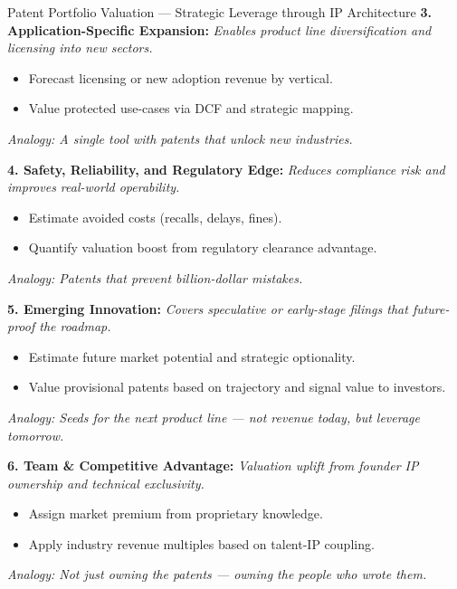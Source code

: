\begin{TechnicalSidebar}{Patent Portfolio Valuation --- Strategic Leverage through IP Architecture}
    \textbf{3. Application-Specific Expansion:}  
    \textit{Enables product line diversification and licensing into new sectors.}

    \medskip
    \begin{itemize}
      \item Forecast licensing or new adoption revenue by vertical.
      \item Value protected use-cases via DCF and strategic mapping.
    \end{itemize}

    \medskip

    \textit{Analogy: A single tool with patents that unlock new industries.}
    
    \medskip
    
    \textbf{4. Safety, Reliability, and Regulatory Edge:}  
    \textit{Reduces compliance risk and improves real-world operability.}

    \medskip
    \begin{itemize}
      \item Estimate avoided costs (recalls, delays, fines).
      \item Quantify valuation boost from regulatory clearance advantage.
    \end{itemize}

    \medskip

    \textit{Analogy: Patents that prevent billion-dollar mistakes.}
    
    \medskip
    
    \textbf{5. Emerging Innovation:}  
    \textit{Covers speculative or early-stage filings that future-proof the roadmap.}

    \medskip
    \begin{itemize}
      \item Estimate future market potential and strategic optionality.
      \item Value provisional patents based on trajectory and signal value to investors.
    \end{itemize}

    \medskip

    \textit{Analogy: Seeds for the next product line — not revenue today, but leverage tomorrow.}
    
    \medskip
    
    \textbf{6. Team \& Competitive Advantage:}  
    \textit{Valuation uplift from founder IP ownership and technical exclusivity.}

    \medskip
    \begin{itemize}
      \item Assign market premium from proprietary knowledge.
      \item Apply industry revenue multiples based on talent-IP coupling.
    \end{itemize}
    \textit{Analogy: Not just owning the patents — owning the people who wrote them.}


\end{TechnicalSidebar}

